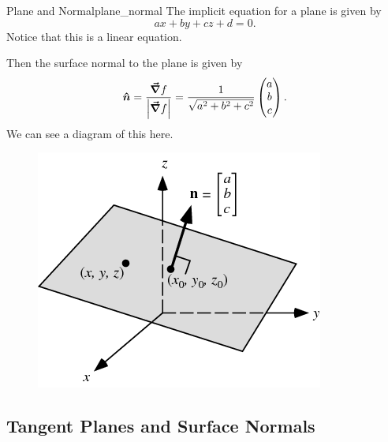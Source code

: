                                         \begin{ex}{Plane and Normal}{plane_normal}
                                        The implicit equation for a plane is given by
                                        \[
                                        ax+by+cz+ d = 0.
                                        \]
                                        Notice that this is a linear equation.
                                        
                                        Then the surface normal to the plane is given by 
                                        \[
                                        \boldsymbol{\hat{n}} = \frac{\boldsymbol{\vec{\nabla}} f}{\left| \boldsymbol{\vec{\nabla}} f\right|} = \frac{1}{\sqrt{a^2+b^2+c^2}}\begin{pmatrix} a \\ b \\ c\end{pmatrix}.
                                        \]
                                        We can see a diagram of this here.
                                        \begin{figure}[H]
                                            \centering
                                            \includegraphics[width=.4\textwidth]{Figures_Part_6/plane_n.png}
                                        \end{figure}
                                        \end{ex}
                                        
                                        
                                        \subsection{Tangent Planes and Surface Normals}
                                        
